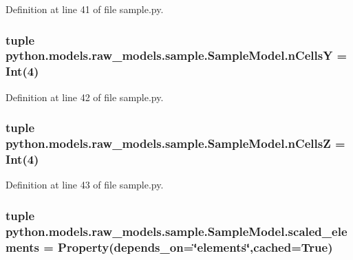 Definition at line 41 of file sample.\-py.

\hypertarget{classpython_1_1models_1_1raw__models_1_1sample_1_1_sample_model_a382e7fe52b95964e6a27b59be1f0a1b9}{
\subsubsection[{n\-Cells\-Y}]{\setlength{\rightskip}{0pt plus 5cm}tuple python.\-models.\-raw\-\_\-models.\-sample.\-Sample\-Model.\-n\-Cells\-Y = Int(4)\hspace{0.3cm}{\ttfamily [static]}}}\label{classpython_1_1models_1_1raw__models_1_1sample_1_1_sample_model_a382e7fe52b95964e6a27b59be1f0a1b9}


Definition at line 42 of file sample.\-py.

\hypertarget{classpython_1_1models_1_1raw__models_1_1sample_1_1_sample_model_a1505e770d394c34c3e47fb07932188ce}{
\subsubsection[{n\-Cells\-Z}]{\setlength{\rightskip}{0pt plus 5cm}tuple python.\-models.\-raw\-\_\-models.\-sample.\-Sample\-Model.\-n\-Cells\-Z = Int(4)\hspace{0.3cm}{\ttfamily [static]}}}\label{classpython_1_1models_1_1raw__models_1_1sample_1_1_sample_model_a1505e770d394c34c3e47fb07932188ce}


Definition at line 43 of file sample.\-py.

\hypertarget{classpython_1_1models_1_1raw__models_1_1sample_1_1_sample_model_a967d917bff50ac2853db3ab230a001e6}{
\subsubsection[{scaled\-\_\-elements}]{\setlength{\rightskip}{0pt plus 5cm}tuple python.\-models.\-raw\-\_\-models.\-sample.\-Sample\-Model.\-scaled\-\_\-elements = Property(depends\-\_\-on=\char`\"{}elements\char`\"{},cached=True)\hspace{0.3cm}{\ttfamily [static]}}}\label{classpython_1_1models_1_1raw__models_1_1sample_1_1_sample_model_a967d917bff50ac2853db3ab230a001e6}


